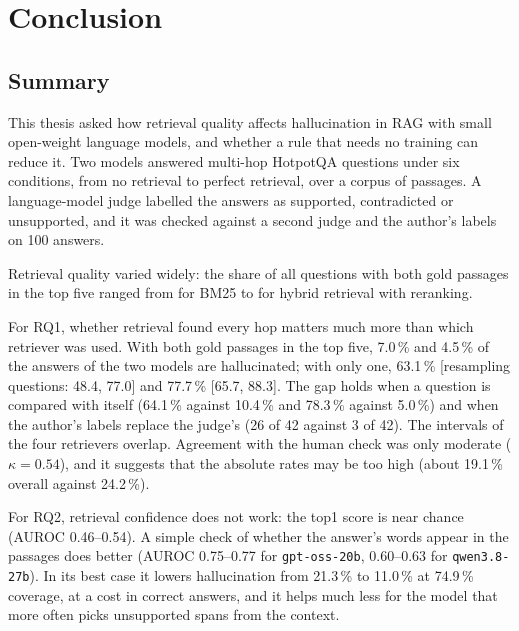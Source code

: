 \chapter{Conclusion}\label{chap:conclusion}

\section{Summary}
This thesis asked how retrieval quality affects hallucination in RAG with small open-weight language
models, and whether a rule that needs no training can reduce it. Two models answered
 multi-hop HotpotQA questions under six conditions, from no retrieval to perfect
retrieval, over a corpus of  passages. A language-model judge labelled the answers as
supported, contradicted or unsupported, and it was checked against a second judge and the author's labels on 100
answers.

Retrieval quality varied widely: the share of all  questions with both gold passages in the
top five ranged from  for BM25 to  for hybrid retrieval with
reranking.

For RQ1, whether retrieval found every hop matters much more than which retriever was used. With both gold passages in
the top five, 7.0\,\% and 4.5\,\% of the answers of the two models are hallucinated; with only one, 63.1\,\% [resampling
questions: 48.4, 77.0] and 77.7\,\% [65.7, 88.3]. The gap holds when a question is compared with itself (64.1\,\% against
10.4\,\% and 78.3\,\% against 5.0\,\%) and when the author's labels replace the judge's (26 of 42 against 3 of 42). The
intervals of the four retrievers overlap. Agreement with the human check was only moderate ($\kappa=0.54$), and it suggests
that the absolute rates may be too high (about 19.1\,\% overall against 24.2\,\%).

For RQ2, retrieval confidence does not work: the top1 score is near chance (AUROC 0.46--0.54). A simple check of whether
the answer's words appear in the passages does better (AUROC 0.75--0.77 for \texttt{gpt-oss-20b}, 0.60--0.63 for
\texttt{qwen3.8-27b}). In its best case it lowers hallucination from 21.3\,\% to 11.0\,\% at 74.9\,\% coverage, at a cost in
correct answers, and it helps much less for the model that more often picks unsupported spans from the context.

